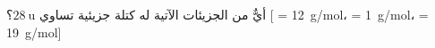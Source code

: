 
\begin{question}

\begin{instance}

\begin{statement}
\par

\end{statement}

\begin{mcq}[standalone=false]

\begin{stem}
أيٌّ من الجزيئات الآتية له كتلة جزيئية تساوي $28\ \textrm{u}$؟ [ = 12\ \textrm{g}/\textrm{mol}،  = 1\ \textrm{g}/\textrm{mol}،  = 19\ \textrm{g}/\textrm{mol}] \par

\end{stem}

\begin{distractors}
\end{distractors}

\end{mcq}

\end{instance}

\end{question}

